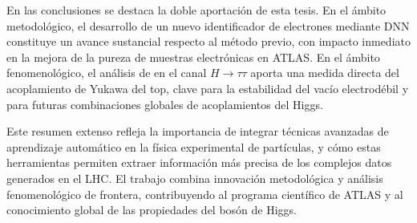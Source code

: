 
En las conclusiones se destaca la doble aportación de esta tesis. En el ámbito metodológico, el desarrollo de un
nuevo identificador de electrones mediante DNN constituye un avance sustancial respecto al método previo, con
impacto inmediato en la mejora de la pureza de muestras electrónicas en ATLAS. En el ámbito fenomenológico, el
análisis de \ttH en el canal $H\to\tau\tau$ aporta una medida directa del acoplamiento de Yukawa del top, clave para
la estabilidad del vacío electrodébil y para futuras combinaciones globales de acoplamientos del Higgs.

Este resumen extenso refleja la importancia de integrar técnicas avanzadas de aprendizaje automático en la física
experimental de partículas, y cómo estas herramientas permiten extraer información más precisa de los complejos datos
generados en el LHC. El trabajo combina innovación metodológica y análisis fenomenológico de frontera, contribuyendo
al programa científico de ATLAS y al conocimiento global de las propiedades del bosón de Higgs.

